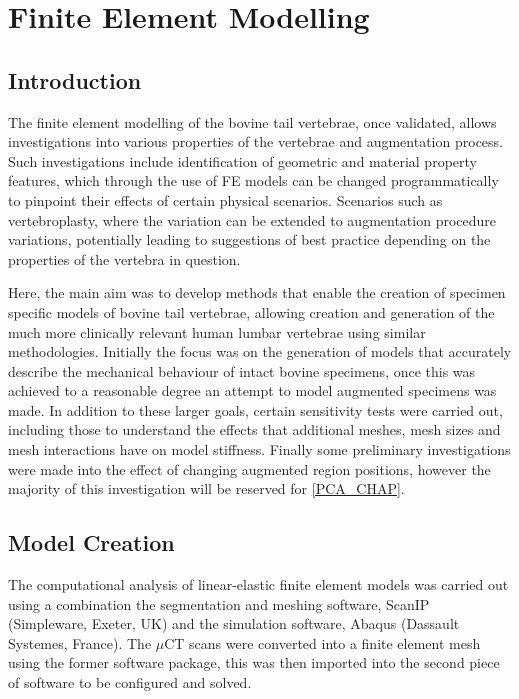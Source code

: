 \section{Finite Element Modelling}\label{finite-element-modelling-methods}

\subsection{Introduction}

The finite element modelling of the bovine tail vertebrae, once validated,
allows investigations into various properties of the vertebrae and augmentation
process.  Such investigations include identification of geometric and material
property features, which through the use of FE models can be changed
programmatically to pinpoint their effects of certain physical scenarios.
Scenarios such as vertebroplasty, where the variation can be extended to
augmentation procedure variations, potentially leading to suggestions of best
practice depending on the properties of the vertebra in question.

Here, the main aim was to develop methods that enable the creation of specimen
specific models of bovine tail vertebrae, allowing creation and generation of
the much more clinically relevant human lumbar vertebrae using similar
methodologies.  Initially the focus was on the generation of models that
accurately describe the mechanical behaviour of intact bovine specimens, once
this was achieved to a reasonable degree an attempt to model augmented
specimens was made. In addition to these larger goals, certain sensitivity
tests were carried out, including those to understand the effects that
additional meshes, mesh sizes and mesh interactions have on model stiffness.
Finally some preliminary investigations were made into the effect of changing
augmented region positions, however the majority of this investigation will be
reserved for \cref{PCA_CHAP}.

\subsection{Model Creation}\label{model-creation}

The computational analysis of linear-elastic finite element models was carried
out using a combination the segmentation and meshing software, ScanIP
(Simpleware, Exeter, UK) and the simulation software, Abaqus (Dassault
Systemes, France). The $\mu$CT scans were converted into a finite element mesh
using the former software package, this was then imported into the second piece
of software to be configured and solved.

